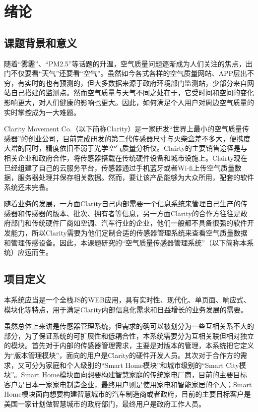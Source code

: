 
\chapter{绪论}
\label{chap:intro}
\section{课题背景和意义}
随着“雾霾”、“PM2.5”等话题的升温，空气质量问题逐渐成为人们关注的焦点，出门不仅要看“天气”还要看“空气”。虽然如今各式各样的空气质量网站、APP层出不穷，有实时的也有预测的，但大多数据来源于政府环境部门监测站，少部分来自网站自己搭建的监测点。然而空气质量与天气不同之处在于，它受时间和空间的变化影响更大，对人们健康的影响也更大。因此，如何满足个人用户对周边空气质量的实时掌控成为一大难题。

Clarity Movement Co.（以下简称Clarity）是一家研发“世界上最小的空气质量传感器”的创业公司，目前完成研发的第二代传感器尺寸与火柴盒差不多大，便携度大增的同时，精度依旧不弱于光学空气质量分析仪。Clairty的主要销售途径是与相关企业和政府合作，将传感器搭载在传统硬件设备和城市设施上。Clairty现在已经组建了自己的云服务平台，传感器通过手机蓝牙或者Wi-fi上传空气质量数据，服务器处理并保存相关数据。然而，要让该产品能够为大众所用，配套的软件系统还未完备。

随着业务的发展，一方面Clarity自己内部需要一个信息系统来管理自己生产的传感器和传感器的版本、批次、拥有者等信息，另一方面Clarity的合作方往往是政府部门和传统硬件厂商如空调、汽车行业的企业，他们一般都不具备很强的软件开发能力，所以Clarity需要为他们定制合适的传感器管理系统来查看空气质量数据和管理传感设备。因此，本课题研究的“空气质量传感器管理系统”（以下简称本系统）应运而生。

\section{项目定义}
本系统应当是一个全栈JS的WEB应用，具有实时性、现代化、单页面、响应式、模块化等特点，用于满足Clarity内部信息化需求和日益增长的业务发展的需要。

虽然总体上来讲是传感器管理系统，但需求的确可以被划分为一些互相关系不大的部分，为了保证系统的可扩展性和低耦合性，本系统需要分为互相关联但相对独立的模块。首先对于内部的传感器管理需求，主要是对版本的管理，本系统把它定义为“版本管理模块”，面向的用户是Clarity的硬件开发人员。其次对于合作方的需求，又可分为家庭和个人级别的“Smart Home模块”和城市级别的“Smart City模块”。Smart Home模块面向想要构建智慧家庭的传统家电厂商，目前的主要目标客户是日本一家家电制造企业，最终用户则是使用家电和智能家居的个人；Smart Home模块面向想要构建智慧城市的汽车制造商或者政府，目前的主要目标客户是美国一家计划做智慧城市的政府部门，最终用户是政府工作人员。

